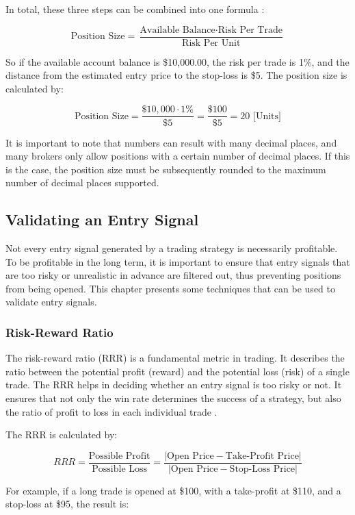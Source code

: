 \noindent
In total, these three steps can be combined into one formula \cite{britannica-position-size}:

\[
    \text{Position Size} = \frac{\text{Available Balance} \cdot \text{Risk Per Trade}}{\text{Risk Per Unit}}
\]

\noindent
So if the available account balance is \$10,000.00, the risk per trade is 1\%, and the distance from the estimated entry price to the stop-loss is \$5.
The position size is calculated by:

\[
    \text{Position Size} = \frac{\$10,000 \cdot 1\%}{\$5}=\frac{\$100}{\$5}=20\text{ [Units]}
\]

\noindent
It is important to note that numbers can result with many decimal places, and many brokers only allow positions with a certain number of decimal places.
If this is the case, the position size must be subsequently rounded to the maximum number of decimal places supported.

\subsection{Validating an Entry Signal}

Not every entry signal generated by a trading strategy is necessarily profitable.
To be profitable in the long term, it is important to ensure that entry signals that are too risky or unrealistic in advance are filtered out, thus preventing positions from being opened.
This chapter presents some techniques that can be used to validate entry signals.

\subsubsection{Risk-Reward Ratio}

The risk-reward ratio (RRR) is a fundamental metric in trading.
It describes the ratio between the potential profit (reward) and the potential loss (risk) of a single trade.
The RRR helps in deciding whether an entry signal is too risky or not.
It ensures that not only the win rate determines the success of a strategy, but also the ratio of profit to loss in each individual trade \cite{rrr-base}.

The RRR is calculated by:

\[
    RRR = \frac{\text{Possible Profit}}{\text{Possible Loss}} = \frac{|\text{Open Price} - \text{Take-Profit Price}|}{|\text{Open Price} - \text{Stop-Loss Price}|}
\]

\noindent
For example, if a long trade is opened at \$100, with a take-profit at \$110, and a stop-loss at \$95, the result is:

